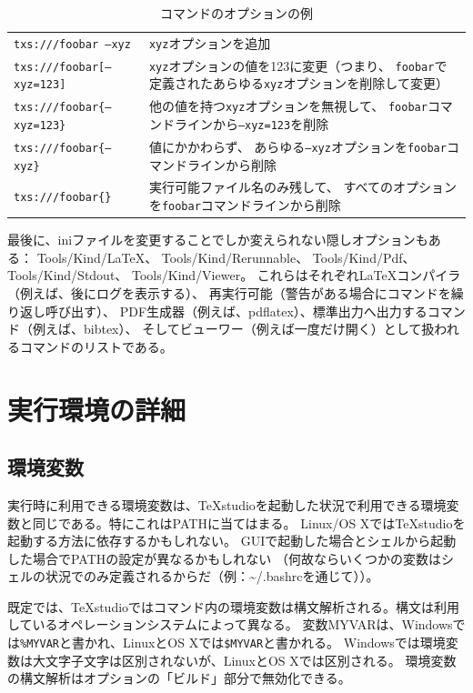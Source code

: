 \begin{table}[H]
  \centering
  \caption{コマンドのオプションの例}
  \begin{tabularx}{\linewidth}{lX}
    \hline
    \texttt{txs:///foobar --xyz} & \texttt{xyz}オプションを追加\\
    \texttt{txs:///foobar{[}--xyz=123{]}}
      & \texttt{xyz}オプションの値を123に変更（つまり、
      \texttt{foobar}で定義されたあらゆる\texttt{xyz}オプションを削除して変更）\\
    \texttt{txs:///foobar\{--xyz=123\}}
      & 他の値を持つ\texttt{xyz}オプションを無視して、
      \texttt{foobar}コマンドラインから\texttt{--xyz=123}を削除\\
    \texttt{txs:///foobar\{--xyz\}} & 値にかかわらず、
      あらゆる\texttt{--xyz}オプションを\texttt{foobar}コマンドラインから削除\\
    \texttt{txs:///foobar\{\}} & 実行可能ファイル名のみ残して、
      すべてのオプションを\texttt{foobar}コマンドラインから削除\\
    \hline
  \end{tabularx}
\end{table}

最後に、iniファイルを変更することでしか変えられない隠しオプションもある：
Tools/Kind/LaTeX、 Tools/Kind/Rerunnable、 Tools/Kind/Pdf、
Tools/Kind/Stdout、 Tools/Kind/Viewer。
これらはそれぞれLaTeXコンパイラ（例えば、後にログを表示する）、
再実行可能（警告がある場合にコマンドを繰り返し呼び出す）、
PDF生成器（例えば、pdflatex）、標準出力へ出力するコマンド（例えば、bibtex）、
そしてビューワー（例えば一度だけ開く）として扱われるコマンドのリストである。

\section{実行環境の詳細}

\subsection{環境変数}
実行時に利用できる環境変数は、TeXstudioを起動した状況で利用できる環境変数と同じである。特にこれはPATHに当てはまる。
Linux/OS XではTeXstudioを起動する方法に依存するかもしれない。
GUIで起動した場合とシェルから起動した場合でPATHの設定が異なるかもしれない
（何故ならいくつかの変数はシェルの状況でのみ定義されるからだ（例：\textasciitilde/.bashrcを通じて））。

既定では、TeXstudioではコマンド内の環境変数は構文解析される。構文は利用しているオペレーションシステムによって異なる。
変数MYVARは、Windowsでは\verb+%MYVAR+と書かれ、LinuxとOS Xでは\verb+$MYVAR+と書かれる。
Windowsでは環境変数は大文字子文字は区別されないが、LinuxとOS Xでは区別される。
環境変数の構文解析はオプションの「ビルド」部分で無効化できる。 

